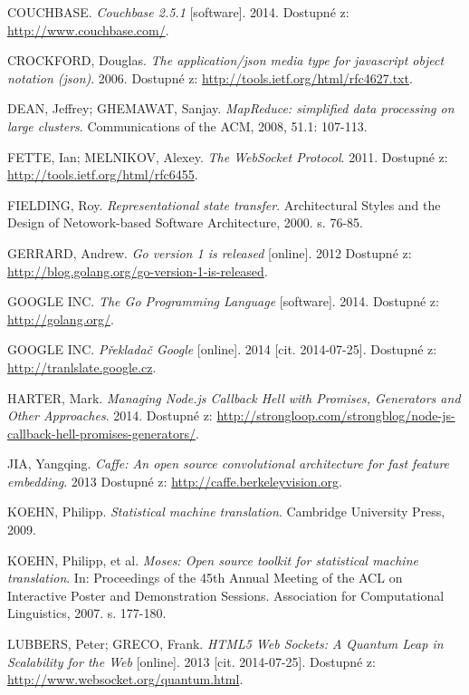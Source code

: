\begin{thebibliography}{99}
  COUCHBASE. \textit{Couchbase 2.5.1} [software]. 2014.
  Dostupné z: \url{http://www.couchbase.com/}.

  CROCKFORD, Douglas. \textit{The application/json media type for javascript object notation (json)}. 2006.
  Dostupné z: \url{http://tools.ietf.org/html/rfc4627.txt}.

  DEAN, Jeffrey; GHEMAWAT, Sanjay. \textit{MapReduce: simplified data processing on large clusters}. Communications of the ACM, 2008, 51.1: 107-113.

  FETTE, Ian; MELNIKOV, Alexey. \textit{The WebSocket Protocol}. 2011.
  Dostupné z: \url{http://tools.ietf.org/html/rfc6455}.

  FIELDING, Roy. \textit{Representational state transfer}. Architectural Styles and the Design of Netowork-based Software Architecture, 2000. s. 76-85.

  GERRARD, Andrew.
  \emph{Go version 1 is released} [online]. 2012
  Dostupné z: \url{http://blog.golang.org/go-version-1-is-released}.

  GOOGLE INC. \textit{The Go Programming Language} [software]. 2014.
  Dostupné z: \url{http://golang.org/}.

  GOOGLE INC. \textit{Překladač Google} [online]. 2014 [cit. 2014-07-25].
  Dostupné z: \url{http://tranlslate.google.cz}.

  HARTER, Mark. \textit{Managing Node.js Callback Hell with Promises, Generators and Other Approaches}. 2014.
  Dostupné z: \url{http://strongloop.com/strongblog/node-js-callback-hell-promises-generators/}.

  JIA, Yangqing. \textit{Caffe: An open source convolutional architecture for fast feature embedding}. 2013
  Dostupné z: \url{http://caffe.berkeleyvision.org}.

  KOEHN, Philipp. \textit{Statistical machine translation}. Cambridge University Press, 2009.

  KOEHN, Philipp, et al. \textit{Moses: Open source toolkit for statistical machine translation}. In: Proceedings of the 45th Annual Meeting of the ACL on Interactive Poster and Demonstration Sessions. Association for Computational Linguistics, 2007. s. 177-180.

  LUBBERS, Peter; GRECO, Frank. \textit{HTML5 Web Sockets: A Quantum Leap in Scalability for the Web} [online].
  2013 [cit. 2014-07-25].
  Dostupné z: \url{http://www.websocket.org/quantum.html}.


\end{thebibliography}
